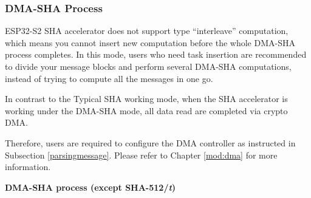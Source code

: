 \documentclass[main\_\_EN.tex]{subfiles}
\begin{document}



\subsubsection{DMA-SHA Process}\label{subsection:dma-sha}

ESP32-S2 SHA accelerator does not support type ``interleave” computation, which means you cannot insert new computation before the whole DMA-SHA process completes. In this mode, users who need task insertion are recommended to divide your message blocks and perform several DMA-SHA computations, instead of trying to compute all the messages in one go.

In contrast to the Typical SHA working mode, when the SHA accelerator is working under the DMA-SHA mode, all data read are completed via crypto DMA.

Therefore, users are required to configure the DMA controller as instructed in Subsection \ref{parsingmessage}. Please refer to Chapter \ref{mod:dma} \textit{} for more information.

\textbf{DMA-SHA process (except SHA-512/{\it{t}})}
\end{document}
